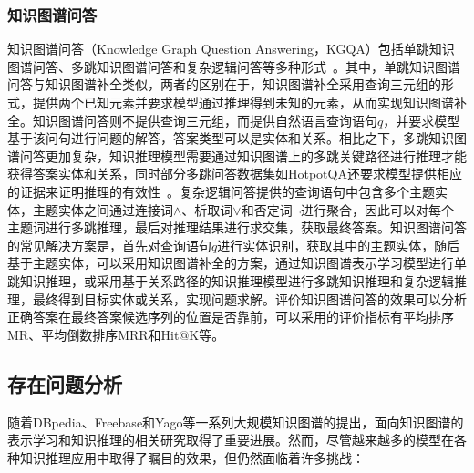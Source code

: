 \documentclass[algorithmlist, AutoFakeBold, AutoFakeSlant, figurelist, tablelist, nomlist, masters]{seuthesix}
\begin{document}
\subsubsection{知识图谱问答}
知识图谱问答（Knowledge Graph Question Answering，KGQA）包括单跳知识图谱问答、多跳知识图谱问答和复杂逻辑问答等多种形式~\cite{saxena2020improving}。其中，单跳知识图谱问答与知识图谱补全类似，两者的区别在于，知识图谱补全采用查询三元组的形式，提供两个已知元素并要求模型通过推理得到未知的元素，从而实现知识图谱补全。知识图谱问答则不提供查询三元组，而提供自然语言查询语句$q$，并要求模型基于该问句进行问题的解答，答案类型可以是实体和关系。相比之下，多跳知识图谱问答更加复杂，知识推理模型需要通过知识图谱上的多跳关键路径进行推理才能获得答案实体和关系，同时部分多跳问答数据集如HotpotQA还要求模型提供相应的证据来证明推理的有效性~\cite{yang2018hotpotqa}。复杂逻辑问答提供的查询语句中包含多个主题实体，主题实体之间通过连接词$\land$、析取词$\vee$和否定词$\neg$进行聚合，因此可以对每个主题词进行多跳推理，最后对推理结果进行求交集，获取最终答案。知识图谱问答的常见解决方案是，首先对查询语句$q$进行实体识别，获取其中的主题实体，随后基于主题实体，可以采用知识图谱补全的方案，通过知识图谱表示学习模型进行单跳知识推理，或采用基于关系路径的知识推理模型进行多跳知识推理和复杂逻辑推理，最终得到目标实体或关系，实现问题求解。评价知识图谱问答的效果可以分析正确答案在最终答案候选序列的位置是否靠前，可以采用的评价指标有平均排序MR、平均倒数排序MRR和Hit@K等。


\subsection{存在问题分析}
随着DBpedia、Freebase和Yago等一系列大规模知识图谱的提出，面向知识图谱的表示学习和知识推理的相关研究取得了重要进展。然而，尽管越来越多的模型在各种知识推理应用中取得了瞩目的效果，但仍然面临着许多挑战：
\end{document}

